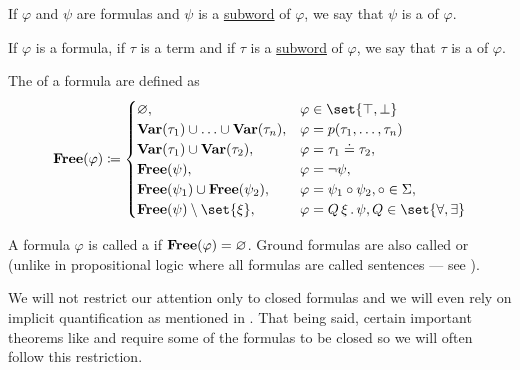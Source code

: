 \begin{definition}
\begin{thmenum}
     If \( \varphi \) and \( \psi \) are formulas and \( \psi \) is a \hyperref[def:language/subword]{subword} of \( \varphi \), we say that \( \psi \) is a  of \( \varphi \).

     If \( \varphi \) is a formula, if \( \tau \) is a term and if \( \tau \) is a \hyperref[def:language/subword]{subword} of \( \varphi \), we say that \( \tau \) is a  of \( \varphi \).

     The  of a formula are defined as
    \begin{equation}\label{eq:def:first_order_syntax/formula_free_variables}
      \boldop{Free}(\varphi) \coloneqq \begin{cases}
        \varnothing,                                                &\varphi \in \set{ \top, \bot } \\
        \boldop{Var}(\tau_1) \cup \ldots \cup \boldop{Var}(\tau_n), &\varphi = p(\tau_1, \ldots, \tau_n) \\
        \boldop{Var}(\tau_1) \cup \boldop{Var}(\tau_2),             &\varphi = \tau_1 \doteq \tau_2, \\
        \boldop{Free}(\psi),                                        &\varphi = \neg \psi, \\
        \boldop{Free}(\psi_1) \cup \boldop{Free}(\psi_2),           &\varphi = \psi_1 \bincirc \psi_2, \bincirc \in \Sigma, \\
        \boldop{Free}(\psi) \setminus \set{ \xi },                  &\varphi = \quantifier{Q}{\xi} \psi, Q \in \set{ \forall, \exists }
      \end{cases}
    \end{equation}

     A formula \( \varphi \) is called a  if \( \operatorname{\mathbf{Free}}(\varphi) = \varnothing \). Ground formulas are also called  or  (unlike in propositional logic where all formulas are called sentences --- see ).

    We will not restrict our attention only to closed formulas and we will even rely on implicit quantification as mentioned in . That being said, certain important theorems like  and  require some of the formulas to be closed so we will often follow this restriction.


\end{thmenum}
\end{definition}
